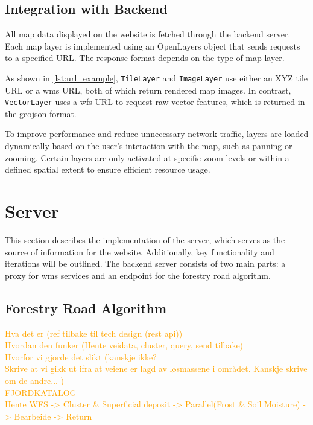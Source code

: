 \subsection{Integration with Backend}

All map data displayed on the website is fetched through the backend server. Each map layer is implemented using an OpenLayers object that sends requests to a specified URL. The response format depends on the type of map layer.

As shown in \autoref{lst:url_example}, \texttt{TileLayer} and \texttt{ImageLayer} use either an XYZ tile URL or a \gls{wms} URL, both of which return rendered map images. In contrast, \texttt{VectorLayer} uses a \gls{wfs} URL to request raw vector features, which is returned in the \gls{geojson} format.

\begin{figure}[h]

\end{figure}

To improve performance and reduce unnecessary network traffic, layers are loaded dynamically based on the user's interaction with the map, such as panning or zooming. Certain layers are only activated at specific zoom levels or within a defined spatial extent to ensure efficient resource usage.

\section{Server}\label{sec:implementation:server}

This section describes the implementation of the server, which serves as the source of information for the website. Additionally, key functionality and iterations will be outlined. The backend server consists of two main parts: a proxy for \Gls{wms} services and an endpoint for the forestry road algorithm. 

\subsection{Forestry Road Algorithm}\label{subsec:server:forestroadalgorithm}

\textcolor{orange}{
Hva det er (ref tilbake til tech design (rest api)) \\
Hvordan den funker (Hente veidata, cluster, query, send tilbake) \\
Hvorfor vi gjorde det slikt (kanskje ikke? \\
Skrive at vi gikk ut ifra at veiene er lagd av løsmassene i området. Kanskje skrive om de andre... 
) \\
FJORDKATALOG \\
Hente WFS -> Cluster \& Superficial deposit -> Parallel(Frost \& Soil Moisture) -> Bearbeide -> Return
}

